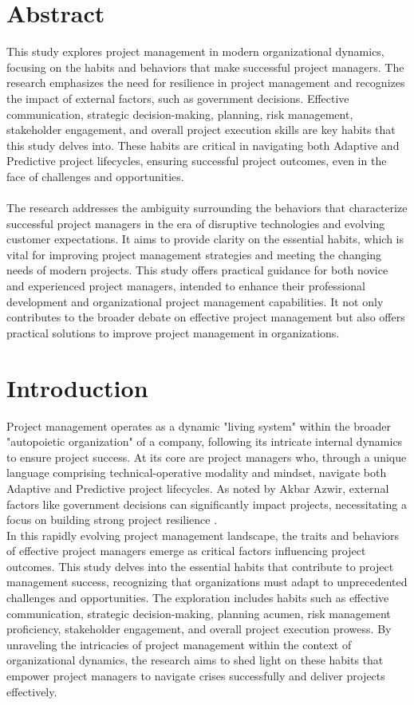 \documentclass{article}
\begin{document}
\section*{Abstract}
This study explores project management in modern organizational dynamics, focusing on the habits and behaviors that make successful project managers. The research emphasizes the need for resilience in project management and recognizes the impact of external factors, such as government decisions. Effective communication, strategic decision-making, planning, risk management, stakeholder engagement, and overall project execution skills are key habits that this study delves into. These habits are critical in navigating both Adaptive and Predictive project lifecycles, ensuring successful project outcomes, even in the face of challenges and opportunities.\\\\
The research addresses the ambiguity surrounding the behaviors that characterize successful project managers in the era of disruptive technologies and evolving customer expectations. It aims to provide clarity on the essential habits, which is vital for improving project management strategies and meeting the changing needs of modern projects. This study offers practical guidance for both novice and experienced project managers, intended to enhance their professional development and organizational project management capabilities. It not only contributes to the broader debate on effective project management but also offers practical solutions to improve project management in organizations.

\newpage

\section{Introduction}
Project management operates as a dynamic "living system" within the broader "autopoietic organization" of a company, following its intricate internal dynamics to ensure project success. At its core are project managers who, through a unique language comprising technical-operative modality and mindset, navigate both Adaptive and Predictive project lifecycles. As noted by Akbar Azwir, external factors like government decisions can significantly impact projects, necessitating a focus on building strong project resilience \cite{Lorenzo_Daniele}.\\

In this rapidly evolving project management landscape, the traits and behaviors of effective project managers emerge as critical factors influencing project outcomes. This study delves into the essential habits that contribute to project management success, recognizing that organizations must adapt to unprecedented challenges and opportunities. The exploration includes habits such as effective communication, strategic decision-making, planning acumen, risk management proficiency, stakeholder engagement, and overall project execution prowess. By unraveling the intricacies of project management within the context of organizational dynamics, the research aims to shed light on these habits that empower project managers to navigate crises successfully and deliver projects effectively.
\end{document}
